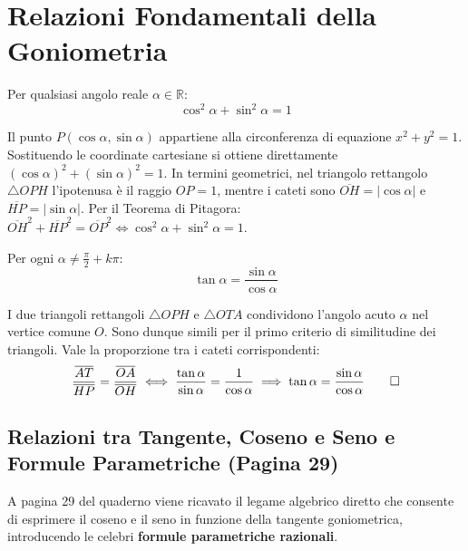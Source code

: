 \documentclass[11pt,a4paper,oneside]{report}
\begin{document}
\section{Relazioni Fondamentali della Goniometria}

\begin{teorema}
Per qualsiasi angolo reale $\alpha \in \mathbb{R}$:
\begin{equation}
    \cos^2\alpha + \sin^2\alpha = 1
\end{equation}
\end{teorema}

\begin{dimostrazione}
Il punto $P(\cos\alpha, \sin\alpha)$ appartiene alla circonferenza di equazione $x^2 + y^2 = 1$. Sostituendo le coordinate cartesiane si ottiene direttamente $(\cos\alpha)^2 + (\sin\alpha)^2 = 1$.
In termini geometrici, nel triangolo rettangolo $\triangle OPH$ l'ipotenusa è il raggio $OP = 1$, mentre i cateti sono $\overline{OH} = |\cos\alpha|$ e $\overline{HP} = |\sin\alpha|$. Per il Teorema di Pitagora: $\overline{OH}^2 + \overline{HP}^2 = \overline{OP}^2 \iff \cos^2\alpha + \sin^2\alpha = 1$.
\end{dimostrazione}

\begin{teorema}
Per ogni $\alpha \neq \frac{\pi}{2} + k\pi$:
\begin{equation}
    \tan\alpha = \frac{\sin\alpha}{\cos\alpha}
\end{equation}
\end{teorema}

\begin{dimostrazione}
I due triangoli rettangoli $\triangle OPH$ e $\triangle OTA$ condividono l'angolo acuto $\alpha$ nel vertice comune $O$. Sono dunque simili per il primo criterio di similitudine dei triangoli. Vale la proporzione tra i cateti corrispondenti:
\begin{equation}
    \frac{\overline{AT}}{\overline{HP}} = \frac{\overline{OA}}{\overline{OH}} \iff \frac{\tan\alpha}{\sin\alpha} = \frac{1}{\cos\alpha} \implies \tan\alpha = \frac{\sin\alpha}{\cos\alpha} \qedhere
\end{equation}
\end{dimostrazione}

\subsection{Relazioni tra Tangente, Coseno e Seno e Formule Parametriche (Pagina 29)}
A pagina 29 del quaderno viene ricavato il legame algebrico diretto che consente di esprimere il coseno e il seno in funzione della tangente goniometrica, introducendo le celebri \textbf{formule parametriche razionali}.
\end{document}
